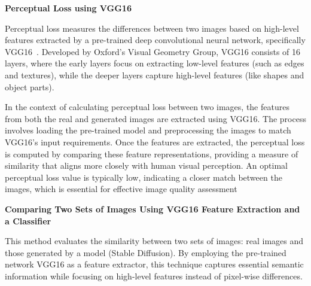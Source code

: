 \documentclass[12pt,DIV14,BCOR12mm,a4paper,footinclude=false,headinclude,parskip=half-,twoside,openright,cleardoublepage=empty,toc=index,bibliography=totoc,listof=totoc]{scrreprt}
\numberwithin{equation}{chapter}
\begin{document}
\textbf{Perceptual Loss using VGG16}

Perceptual loss measures the differences between two images based on high-level features extracted by a pre-trained deep convolutional neural network, specifically VGG16~\cite{VGG16}. Developed by Oxford's Visual Geometry Group, VGG16 consists of 16 layers, where the early layers focus on extracting low-level features (such as edges and textures), while the deeper layers capture high-level features (like shapes and object parts).

In the context of calculating perceptual loss between two images, the features from both the real and generated images are extracted using VGG16. The process involves loading the pre-trained model and preprocessing the images to match VGG16's input requirements. Once the features are extracted, the perceptual loss is computed by comparing these feature representations, providing a measure of similarity that aligns more closely with human visual perception. An optimal perceptual loss value is typically low, indicating a closer match between the images, which is essential for effective image quality assessment

\textbf{Comparing Two Sets of Images Using VGG16 Feature Extraction and a Classifier}

This method evaluates the similarity between two sets of images: real images and those generated by a model (Stable Diffusion). By employing the pre-trained network VGG16 as a feature extractor, this technique captures essential semantic information while focusing on high-level features instead of pixel-wise differences.
\end{document}
